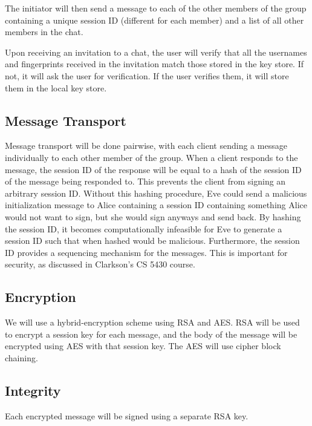 \documentclass{scrartcl}
\begin{document}
The initiator will then send a message to each of the other members of the group containing a unique session ID (different for each member) and a list of all other members in the chat.

Upon receiving an invitation to a chat, the user will verify that all the usernames and fingerprints received in the invitation match those stored in the key store. If not, it will ask the user for verification. If the user verifies them, it will store them in the local key store.

\subsection{Message Transport}
Message transport will be done pairwise, with each client sending a message individually to each other member of the group. When a client responds to the message, the session ID of the response will be equal to a hash of the session ID of the message being responded to. This prevents the client from signing an arbitrary session ID. Without this hashing procedure, Eve could send a malicious initialization message to Alice containing a session ID containing something Alice would not want to sign, but she would sign anyways and send back. By hashing the session ID, it becomes computationally infeasible for Eve to generate a session ID such that when hashed would be malicious. Furthermore, the session ID provides a sequencing mechanism for the messages. This is important for security, as discussed in Clarkson's CS 5430 course. 

\subsection{Encryption} 
We will use a hybrid-encryption scheme using RSA and AES. RSA will be used to encrypt a session key for each message, and the body of the message will be encrypted using AES with that session key. The AES will use cipher block chaining.

\subsection{Integrity}
Each encrypted message will be signed using a separate RSA key.
\end{document}
